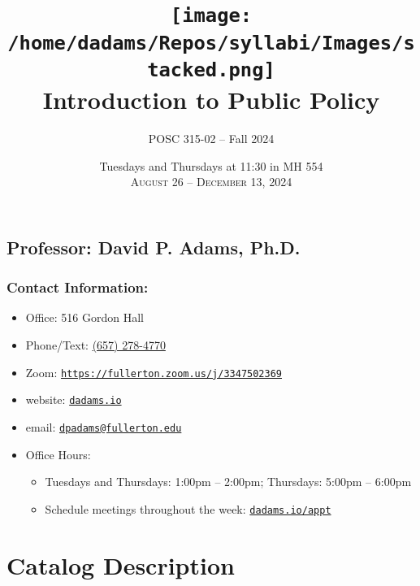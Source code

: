 \documentclass[12pt, letterpaper]{article}
\begin{document}
\title{\texttt{[image: /home/dadams/Repos/syllabi/Images/stacked.png]} \\\vspace{1ex} \textbf{Introduction to Public Policy}}

\author{POSC 315-02 -- Fall 2024}
\date{Tuesdays and Thursdays at 11:30 in MH 554 \\\vspace{2ex} \textsc{August 26 -- December 13, 2024}}

    \maketitle


\subsection*{Professor: David P. Adams, Ph.D.}

\subsubsection*{Contact Information:}

\begin{itemize}
	\item Office: 516 Gordon Hall
	\item Phone/Text: \href{tel:+16572784770}{(657) 278-4770}
	\item Zoom: \href{https://fullerton.zoom.us/j/3347502369}{\texttt{https://fullerton.zoom.us/j/3347502369}}
	\item website: \href{https://dadams.io}{\texttt{dadams.io}}
	\item email: \href{dpadams@fullerton.edu}{\texttt{dpadams@fullerton.edu}}
	\item Office Hours:
        \begin{itemize}
            \item Tuesdays and Thursdays: 1:00pm -- 2:00pm; Thursdays: 5:00pm -- 6:00pm
            \item Schedule meetings throughout the week: \href{https://dadams.io/appt}{\texttt{dadams.io/appt}}
        \end{itemize}  
\end{itemize}


\section{Catalog Description}
\end{document}
